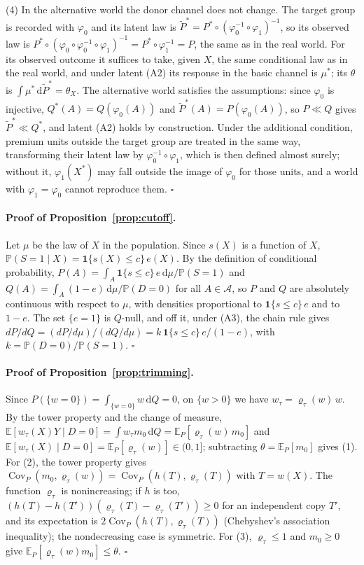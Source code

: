 \documentclass[twoside,11pt]{article}
\newcommand{\E}{\mathbb{E}}
\newcommand{\PP}{\mathbb{P}}
\newcommand{\ind}{\mathbf{1}}
\newcommand{\A}{\mathcal{A}}
\newcommand{\dd}{\,\mathrm{d}}
\newcommand{\Cov}{\operatorname{Cov}}
\theoremstyle{plain}
\theoremstyle{definition}
\begin{document}
(4) In the alternative world the donor channel does not change. The target group is recorded with $\varphi_0$ and its latent law is $\tilde P^*=P^*\circ(\varphi_0^{-1}\circ\varphi_1)^{-1}$, so its observed law is $P^*\circ(\varphi_0\circ\varphi_0^{-1}\circ\varphi_1)^{-1}=P^*\circ\varphi_1^{-1}=P$, the same as in the real world. For its observed outcome it suffices to take, given $X$, the same conditional law as in the real world, and under latent (A2) its response in the basic channel is $\mu^*$; its $\theta$ is $\int\mu^*\dd\tilde P^*=\theta_X$. The alternative world satisfies the assumptions: since $\varphi_0$ is injective, $Q^*(A)=Q(\varphi_0(A))$ and $\tilde P^*(A)=P(\varphi_0(A))$, so $P\ll Q$ gives $\tilde P^*\ll Q^*$, and latent (A2) holds by construction. Under the additional condition, premium units outside the target group are treated in the same way, transforming their latent law by $\varphi_0^{-1}\circ\varphi_1$, which is then defined almost surely; without it, $\varphi_1(X^*)$ may fall outside the image of $\varphi_0$ for those units, and a world with $\varphi_1=\varphi_0$ cannot reproduce them.
\hfill$\square$


\paragraph{Proof of Proposition~\ref{prop:cutoff}.}
Let $\mu$ be the law of $X$ in the population. Since $s(X)$ is a function of $X$, $\PP(S=1\mid X)=\ind\{s(X)\le c\}\,e(X)$. By the definition of conditional probability, $P(A)=\int_A\ind\{s\le c\}\,e\dd\mu/\PP(S=1)$ and $Q(A)=\int_A(1-e)\dd\mu/\PP(D=0)$ for all $A\in\A$, so $P$ and $Q$ are absolutely continuous with respect to $\mu$, with densities proportional to $\ind\{s\le c\}\,e$ and to $1-e$. The set $\{e=1\}$ is $Q$-null, and off it, under (A3), the chain rule gives $dP/dQ=(dP/d\mu)/(dQ/d\mu)=k\,\ind\{s\le c\}\,e/(1-e)$, with $k=\PP(D=0)/\PP(S=1)$.
\hfill$\square$


\paragraph{Proof of Proposition~\ref{prop:trimming}.}
Since $P(\{w=0\})=\int_{\{w=0\}}w\dd Q=0$, on $\{w>0\}$ we have $w_\tau=\varrho_\tau(w)\,w$. By the tower property and the change of measure, $\E[w_\tau(X)Y\mid D=0]=\int w_\tau m_0\dd Q=\E_P[\varrho_\tau(w)\,m_0]$ and $\E[w_\tau(X)\mid D=0]=\E_P[\varrho_\tau(w)]\in(0,1]$; subtracting $\theta=\E_P[m_0]$ gives (1). For (2), the tower property gives $\Cov_P(m_0,\varrho_\tau(w))=\Cov_P(h(T),\varrho_\tau(T))$ with $T=w(X)$. The function $\varrho_\tau$ is nonincreasing; if $h$ is too, $(h(T)-h(T'))(\varrho_\tau(T)-\varrho_\tau(T'))\ge0$ for an independent copy $T'$, and its expectation is $2\Cov_P(h(T),\varrho_\tau(T))$ (Chebyshev's association inequality); the nondecreasing case is symmetric. For (3), $\varrho_\tau\le1$ and $m_0\ge0$ give $\E_P[\varrho_\tau(w)m_0]\le\theta$.
\hfill$\square$
\end{document}

